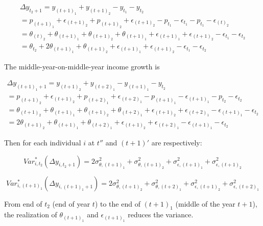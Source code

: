 \documentclass[12pt,notitlepage,onecolumn,aps,pra]{article}
\begin{document}
\begin{equation}
\begin{split}
\Delta y_{t_2+1} = y_{(t+1)_1}+ y_{(t+1)_2} - y_{t_1 } - y_{t_2}  \\
 = p_{(t+1)_1} + \epsilon_{(t+1)_2} + p_{(t+1)_2} + \epsilon_{(t+1)_2} - p_{t_1} - \epsilon_{t_1} - p_{t_1} - \epsilon_{(t)_2 } \\
 = \theta_{(t)_2} + \theta_{(t+1)_1} + \theta_{(t+1)_2} + \theta_{(t+1)_1} + \epsilon_{(t+1)_1} + \epsilon_{(t+1)_2} - \epsilon_{t_1} - \epsilon_{t_2} \\
 =  \theta_{t_2} + 2\theta_{(t+1)_1} + \theta_{(t+1)_2} + \epsilon_{(t+1)_1} + \epsilon_{(t+1)_2} - \epsilon_{t_1} - \epsilon_{t_2} 
\end{split}
\end{equation}

The middle-year-on-middle-year income growth is

\begin{equation}
\begin{split}
\Delta y_{(t+1)_1+1} = y_{(t+1)_2}+ y_{(t+2)_1} - y_{(t+1)_1} - y_{t_2}  \\
 = p_{(t+1)_2} + \epsilon_{(t+1)_2} + p_{(t+2)_1} + \epsilon_{(t+2)_1} - p_{(t+1)_1} - \epsilon_{(t+1)_1} - p_{t_2} - \epsilon_{t_2 } \\
 = \theta_{(t+1)_2} + \theta_{(t+1)_1} + \theta_{(t+1)_2} + \theta_{(t+2)_1} + \epsilon_{(t+1)_2} + \epsilon_{(t+2)_1} - \epsilon_{(t+1)_1} - \epsilon_{t_2 } \\
 = 2\theta_{(t+1)_2} + \theta_{(t+1)_1} + \theta_{(t+2)_1} + \epsilon_{(t+1)_2} + \epsilon_{(t+2)_1} - \epsilon_{(t+1)_1} - \epsilon_{t_2 }
\end{split}
\end{equation}

Then for each individual \(i\) at \(t''\) and \((t+1)'\) are
respectively:

\begin{equation}
Var^*_{i,t_2}(\Delta y_{i,t_2+1}) =  2\sigma^2_{\theta,(t+1)_1} + \sigma^2_{\theta,(t+1)_2} + \sigma^2_{\epsilon,(t+1)_1} + \sigma^2_{\epsilon,(t+1)_2}
\end{equation}

\begin{equation}
Var^*_{i,(t+1)_1}(\Delta y_{i,(t+1)_1+1}) =  2\sigma^2_{\theta,(t+1)_2} + \sigma^2_{\theta,(t+2)_1} + \sigma^2_{\epsilon,(t+1)_2} + \sigma^2_{\epsilon,(t+2)_1}
\end{equation}

From end of \(t_2\) (end of year \(t\)) to the end of \((t+1)_1\)
(middle of the year \(t+1\)), the realization of \(\theta_{(t+1)_1}\)
and \(\epsilon_{(t+1)_1}\) reduces the variance.
\end{document}
